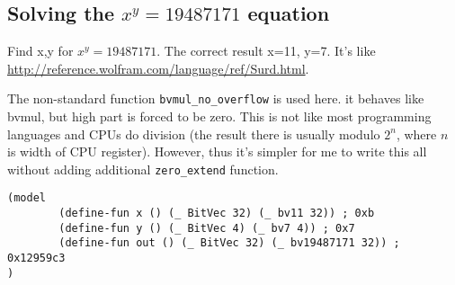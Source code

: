 \subsection{Solving the $x^y=19487171$ equation}

Find x,y for $x^y=19487171$.
The correct result x=11, y=7.
It's like \url{http://reference.wolfram.com/language/ref/Surd.html}.

The non-standard function \verb|bvmul_no_overflow| is used here. it behaves like bvmul, but high part is forced to be zero.
This is not like most programming languages and CPUs do division (the result there is usually modulo $2^n$, where $n$ is width of CPU register).
However, thus it's simpler for me to write this all without adding additional \verb|zero_extend| function.



\begin{lstlisting}[caption=The solution]
(model
        (define-fun x () (_ BitVec 32) (_ bv11 32)) ; 0xb
        (define-fun y () (_ BitVec 4) (_ bv7 4)) ; 0x7
        (define-fun out () (_ BitVec 32) (_ bv19487171 32)) ; 0x12959c3
)
\end{lstlisting}

